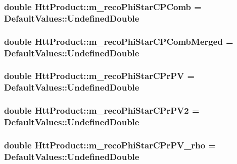 \label{classHttProduct_acbda6aa9798ef7cb8c3cefb04cf81bce}
\hypertarget{classHttProduct_a94f1cb54eab52625888eda222d67e21d}{
\subsubsection[{m\_\-recoPhiStarCPComb}]{\setlength{\rightskip}{0pt plus 5cm}double {\bf HttProduct::m\_\-recoPhiStarCPComb} = DefaultValues::UndefinedDouble}}
\label{classHttProduct_a94f1cb54eab52625888eda222d67e21d}
\hypertarget{classHttProduct_a1d8bfbc2f1469b322c46f058b8a2eaf2}{
\subsubsection[{m\_\-recoPhiStarCPCombMerged}]{\setlength{\rightskip}{0pt plus 5cm}double {\bf HttProduct::m\_\-recoPhiStarCPCombMerged} = DefaultValues::UndefinedDouble}}
\label{classHttProduct_a1d8bfbc2f1469b322c46f058b8a2eaf2}
\hypertarget{classHttProduct_a40b2f8b7d918c15baa3a1adc88e5bd84}{
\subsubsection[{m\_\-recoPhiStarCPrPV}]{\setlength{\rightskip}{0pt plus 5cm}double {\bf HttProduct::m\_\-recoPhiStarCPrPV} = DefaultValues::UndefinedDouble}}
\label{classHttProduct_a40b2f8b7d918c15baa3a1adc88e5bd84}
\hypertarget{classHttProduct_ac8e1ce629cd837f8fc345c13390ceec9}{
\subsubsection[{m\_\-recoPhiStarCPrPV2}]{\setlength{\rightskip}{0pt plus 5cm}double {\bf HttProduct::m\_\-recoPhiStarCPrPV2} = DefaultValues::UndefinedDouble}}
\label{classHttProduct_ac8e1ce629cd837f8fc345c13390ceec9}
\hypertarget{classHttProduct_a497bb3a130adff99248aba9890339632}{
\subsubsection[{m\_\-recoPhiStarCPrPV\_\-rho}]{\setlength{\rightskip}{0pt plus 5cm}double {\bf HttProduct::m\_\-recoPhiStarCPrPV\_\-rho} = DefaultValues::UndefinedDouble}}
